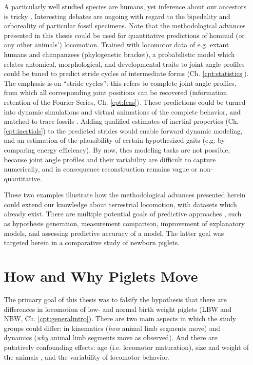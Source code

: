 A particularly well studied species are humans, yet inference about our ancestors is tricky \citep{Polk2004,Cazenave2023,Stamos2023}.
Interesting debates are ongoing with regard to the bipedality and arboreality of particular fossil specimens.
Note that the methodological advances presented in this thesis could be used for quantitative predictions of hominid (or any other animals') locomotion.
Trained with locomotor data of e.g. extant humans and chimpanzees (phylogenetic bracket), a probabilistic model which relates antomical, morphological, and developmental traits to joint angle profiles could be tuned to predict stride cycles of intermediate forms (Ch. \ref{cpt:statistics}).
The emphasis is on ``stride cycles'': this refers to complete joint angle profiles, from which all corresponding joint positions can be recovered (information retention of the Fourier Series, Ch. \ref{cpt:fcas}).
These predictions could be turned into dynamic simulations and virtual animations of the complete behavior, and matched to trace fossils \citep[as in][but with less manual work]{Nyakatura2019}.
Adding qualified estimates of inertial properties (Ch. \ref{cpt:inertials}) to the predicted strides would enable forward dynamic modeling, and an estimation of the plausibility of certain hypothesized gaits (e.g. by comparing energy efficiency).
By now, thes modeling tasks are not possible, because joint angle profiles and their variability are difficult to capture numerically, and in consequence reconstruction remains vague or non-quantitative.


These two examples illustrate how the methodological advances presented herein could extend our knowledge about terrestrial locomotion, with datasets which already exist.
There are multiple potential goals of predictive approaches \citep{Shmueli2010}, such as hypothesis generation, measurement comparison, improvement of explanatory models, and assessing predictive accuracy of a model.
The latter goal was targeted herein in a comparative study of newborn piglets.


\section{How and Why Piglets Move}
\label{sec:org7ca25fe}
The primary goal of this thesis was to falsify the hypothesis that there are differences in locomotion of low- and normal birth weight piglets (LBW and NBW, Ch. \ref{cpt:generalintro}).
There are two main aspects in which the study groups could differ: in kinematics (\emph{how} animal limb segments move) and dynamics (\emph{why} animal limb segments move as observed).
And there are putatively confounding effects: age (i.e. locomotor maturation), size and weight of the animals \citep[i.e. physical appearance, cf.][]{Aerts2023}, and the variability of locomotor behavior.


